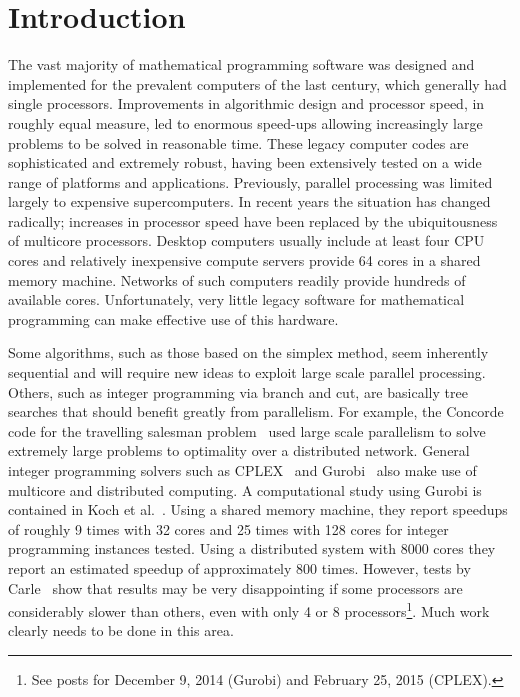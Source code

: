 \documentclass[a4paper,11pt]{article}   \usepackage{authblk} \usepackage[top=1.9cm,bottom=1.9cm,left=1.9cm,right=1.9cm]{geometry}
\begin{document}
\section{Introduction}
\label{sec:intro}
The vast majority of mathematical programming software was designed and implemented for the prevalent
computers of the last century, which generally had single processors. Improvements in algorithmic design
and processor speed, in roughly equal measure, led to enormous speed-ups allowing increasingly
large problems to be solved in reasonable time. These legacy computer codes are sophisticated and extremely robust,
having been extensively tested on a wide range of platforms and applications. Previously,  
parallel processing was limited largely to expensive supercomputers. In recent years the situation
has changed radically;  increases in processor speed have been replaced by the ubiquitousness of multicore
processors. Desktop computers usually include at least four CPU cores and relatively inexpensive compute servers provide 
64 cores in a shared memory machine. Networks of such computers readily provide hundreds of available cores.
Unfortunately, very little legacy software for mathematical programming can make effective use of this hardware.

Some algorithms, such as those based on the simplex method, seem inherently sequential and will require new ideas
to exploit large scale parallel processing.
Others, such as integer programming via branch and cut, are basically tree searches that should benefit
greatly from parallelism. For example, the Concorde code for the travelling salesman problem~\cite{concorde,ABCC}
used large scale parallelism to solve extremely large problems to optimality over a distributed network.
General integer programming solvers such as CPLEX~\cite{cplex} and Gurobi~\cite{gurobi} also make use of multicore and distributed computing.
A computational study using Gurobi is contained in Koch et al.~\cite{Koch2012}. Using a shared memory machine, they report
speedups of roughly 9 times with 32 cores and 25 times with 128 cores for integer programming instances tested.
Using a distributed system with 8000 cores they report an estimated speedup of approximately 800 times.
However,
tests by Carle~\cite{Carle} show that results may be very disappointing if some processors are considerably slower than others, even with only 4 or 8 processors\footnote{See posts for December 9, 2014 (Gurobi) and
February 25, 2015 (CPLEX).}. Much work clearly needs to be done in this area.
\end{document}
